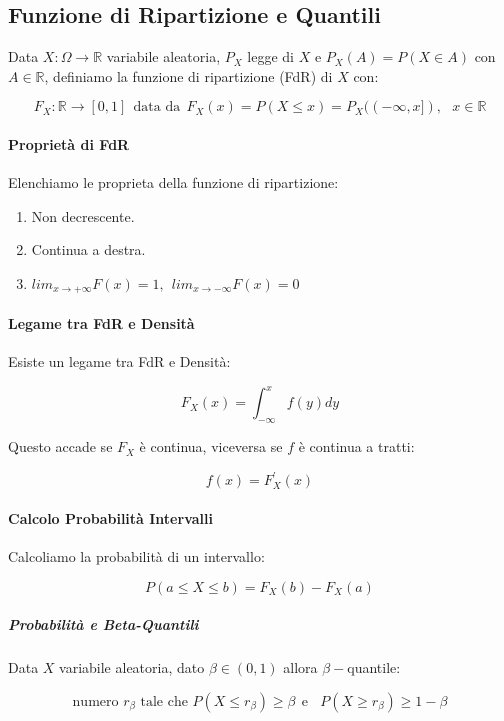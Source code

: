 \documentclass{article}
\begin{document}
\newpage

\subsection{Funzione di Ripartizione e Quantili}

Data $X: \Omega \rightarrow \mathbb{R}$ variabile aleatoria, $P_{X}$ legge di $X$ e $P_{X}(A) = P(X \in A)$ con $A \in \mathbb{R}$, definiamo la funzione
di ripartizione (FdR) di $X$ con:

\[ F_{X}: \mathbb{R} \rightarrow [0,1] \: \: \text{data da} \: \: F_{X}(x) = P(X \leq x) = P_{X}((-\infty, x]), \:\:\: x \in \mathbb{R}  \]

\paragraph{Proprietà di FdR} Elenchiamo le proprieta della funzione di ripartizione:

\begin{enumerate}
    \item Non decrescente.
    \item Continua a destra.
    \item $lim_{x \rightarrow +\infty} F(x) = 1, \:\: lim_{x \rightarrow -\infty} F(x) = 0 $
\end{enumerate}

\paragraph{Legame tra FdR e Densità} Esiste un legame tra FdR e Densità:

\[ F_{X}(x) = \int_{-\infty}^{x} f(y)dy \]

Questo accade se $F_{X}$ è continua, viceversa se $f$ è continua a tratti:

\[ f(x) = F^{'}_{X}(x) \]

\paragraph{Calcolo Probabilità Intervalli} Calcoliamo la probabilità di un intervallo:

\[ P(a \leq X \leq b) = F_{X}(b) - F_{X}(a) \]

\subparagraph{Probabilità e Beta-Quantili} Data $X$ variabile aleatoria, dato $\beta \in (0,1)$ allora $\beta-$quantile:

\[ \text{numero } r_{\beta} \text{ tale che } P(X \leq r_{\beta}) \geq \beta \: \: \text{e} \: \: \: \: P(X \geq r_{\beta}) \geq 1 - \beta \]
\end{document}

